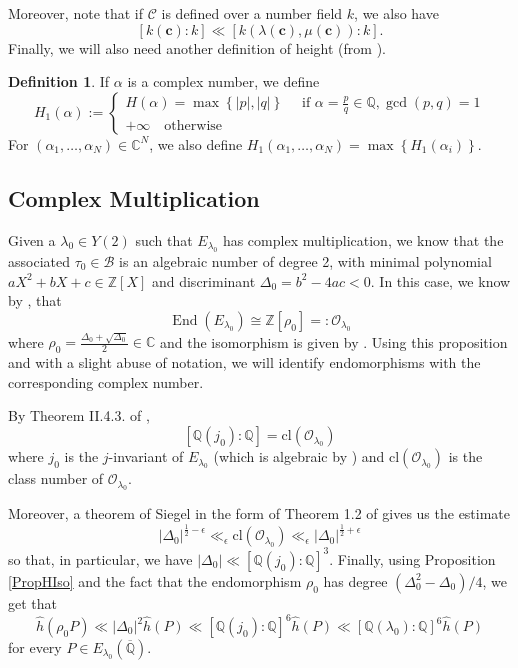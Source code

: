 \documentclass[11pt,a4paper,reqno]{amsart}
\numberwithin{equation}{section}
\newcommand{\Z}{\mathbb{Z}}
\newcommand{\Q}{\mathbb{Q}}
\newcommand{\C}{\mathbb{C}}
\newcommand{\Qal}{\overline{\mathbb{Q}}}
\renewcommand{\c}{\mathcal{C}}
\newcommand{\cc}{\mathbf{c}}
\renewcommand{\a}{\alpha}
\renewcommand{\l}{\lambda}
\newcommand{\m}{\mu}
\renewcommand{\r}{\rho}
\newcommand{\pt}[1]{\left( #1 \right)}
\newcommand{\pq}[1]{\left[ #1 \right]}
\newcommand{\pg}[1]{\left\lbrace #1 \right\rbrace}
\newcommand{\abs}[1]{\left| #1 \right|}
\DeclareMathOperator{\en}{End}
\theoremstyle{remark}
\theoremstyle{definition}
\theoremstyle{definition}
\newtheorem{definition}[theorem]{Definition}
\begin{document}
Moreover, note that if $\c$ is defined over a number field $k$, we also have 
$$\pq{k(\cc):k}\ll \pq{k(\l(\cc),\m(\cc)):k}.$$
Finally, we will also need another definition of height (from \cite{Pil09}).
\begin{definition}
If $\a$ is a complex number, we define
$$H_1(\a):=\begin{cases}
H(\a)=\max\pg{\abs{p},\abs{q}} \quad \text{ if } \a=\frac{p}{q} \in \Q, \gcd(p,q)=1\\
+\infty \quad \text{otherwise}
\end{cases}$$
For $(\a_1, \ldots, \a_N) \in \C^N$, we also define $H_1(\a_1, \ldots, \a_N)=\max\pg{H_1(\a_i)}$.
\end{definition}

\subsection{Complex Multiplication}
Given a $\l_0 \in Y(2)$ such that $E_{\l_0}$ has complex multiplication, we know that the associated $\tau_0 \in \mathcal{B}$ is an algebraic number of degree 2, with minimal polynomial $aX^2+bX+c \in \Z[X]$ and discriminant $\Delta_0=b^2-4ac <0$. In this case, we know by \cite[Theorem 1, p. 90]{Lan87}, that 
$$\en(E_{\l_0})\cong \Z\pq{\r_0}=:\mathcal{O}_{\l_0}$$
where $\r_0=\frac{\Delta_0+\sqrt{\Delta_0}}{2} \in \C$ and the isomorphism is given by \cite[Proposition II.1.1]{Sil94}. Using this proposition and with a slight abuse of notation, we will identify endomorphisms with the corresponding complex number.

By Theorem II.4.3. of \cite{Sil94},
$$\pq{\Q(j_0):\Q}=\mathrm{cl}(\mathcal{O}_{\l_0})$$
where $j_0$ is the $j$-invariant of $E_{\l_0}$ (which is algebraic by \cite[Proposition II.2.1]{Sil94}) and $\mathrm{cl}(\mathcal{O}_{\l_0})$ is the class number of $\mathcal{O}_{\l_0}$.

Moreover, a theorem of Siegel in the form of Theorem 1.2 of \cite{Bre01} gives us the estimate
$$\abs{\Delta_0}^{\frac{1}{2}-\epsilon}\ll_{\epsilon} \mathrm{cl}(\mathcal{O}_{\l_0}) \ll_{\epsilon} \abs{\Delta_0}^{\frac{1}{2}+\epsilon} $$
so that, in particular, we have $\abs{\Delta_0}\ll \pq{\Q(j_0):\Q}^3$. Finally, using Proposition \ref{PropHIso} and the fact that the endomorphism $\r_0$ has degree $\pt{\Delta_0^2-\Delta_0}/4$, we get that
\begin{equation}\label{diseq_alt_rhoP}
\widehat{h}(\r_0 P)\ll \abs{\Delta_0}^2 \widehat{h}(P) \ll \pq{\Q(j_0):\Q}^6 \widehat{h}(P) \ll \pq{\Q(\l_0):\Q}^6 \widehat{h}(P)
\end{equation}
for every $P \in E_{\l_0}\!\!\pt{\Qal}$.
\end{document}
